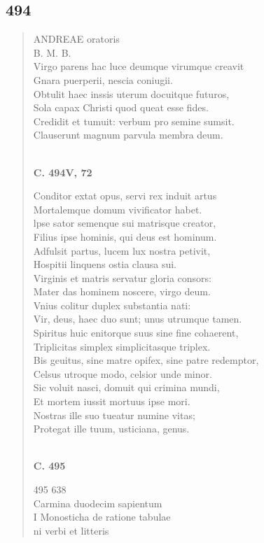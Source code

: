 \documentclass[11pt, a4paper]{report}
\begin{document}
            \subsection*{494}
      \begin{verse}
      ANDREAE oratoris \\ B. M. B. \\ Virgo parens hac luce deumque virumque creavit \\ Gnara puerperii, nescia coniugii. \\ Obtulit haec inssis uterum docuitque futuros, \\ Sola capax Christi quod queat esse fides. \\ Credidit et tumuit: verbum pro semine sumsit. \\ Clauserunt magnum parvula membra deum. \\ 
        ﻿\pagebreak 
     \marginpar{[58]} \begin{center} \textbf{C. 494V, 72} \end{center}Conditor extat opus, servi rex induit artus \\ Mortalemque domum vivificator habet. \\ lpse sator semenque sui matrisque creator, \\ Filius ipse hominis, qui deus est hominum. \\ Adfulsit partus, lucem lux nostra petivit, \\ Hospitii linquens ostia clausa sui. \\ Virginis et matris servatur gloria consors: \\ Mater das hominem noscere, virgo deum. \\ Vnius colitur duplex substantia nati: \\ Vir, deus, haec duo sunt; unus utrumque tamen. \\ Spiritus huic enitorque suus sine fine cohaerent, \\ Triplicitas simplex simplicitasque triplex. \\ Bis geuitus, sine matre opifex, sine patre redemptor, \\ Celsus utroque modo, celsior unde minor. \\ Sic voluit nasci, domuit qui crimina mundi, \\ Et mortem iussit mortuus ipse mori. \\ Nostras ille suo tueatur numine vitas; \\ Protegat ille tuum, usticiana, genus. \\ 
        ﻿\pagebreak 
    \begin{center} \textbf{C. 495} \end{center} \marginpar{[59]} 495 638 \\ Carmina duodecim sapientum \\ I Monosticha de ratione tabulae \\ ni verbi et litteris \\ 
      \end{verse}
  
\end{document}
